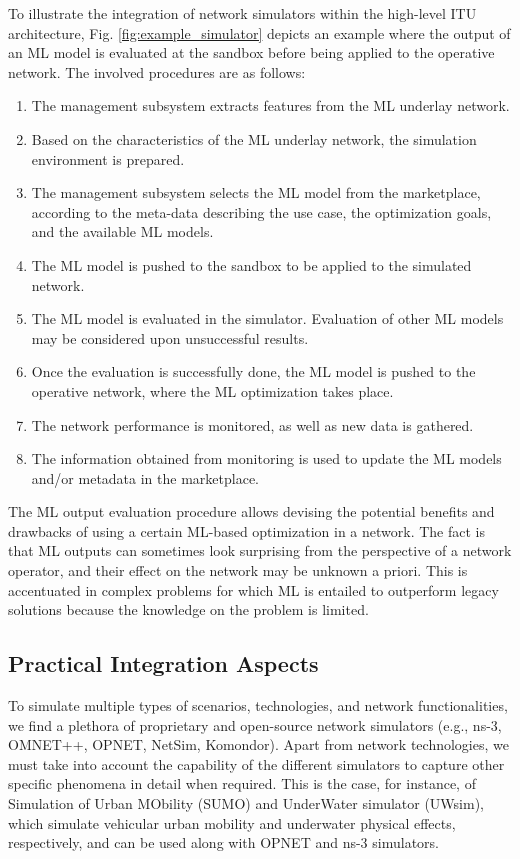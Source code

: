 \documentclass[journal]{IEEEtran}
\begin{document}
	To illustrate the integration of network simulators within the high-level ITU architecture, Fig. \ref{fig:example_simulator} depicts an example where the output of an ML model is evaluated at the sandbox before being applied to the operative network. The involved procedures are as follows:
	\begin{enumerate}
		\item The management subsystem extracts features from the ML underlay network.
		\item Based on the characteristics of the ML underlay network, the simulation environment is prepared.
		\item The management subsystem selects the ML model from the marketplace, according to the meta-data describing the use case, the optimization goals, and the available ML models.
		\item The ML model is pushed to the sandbox to be applied to the simulated network.
		\item The ML model is evaluated in the simulator. Evaluation of other ML models may be considered upon unsuccessful results.
		\item Once the evaluation is successfully done, the ML model is pushed to the operative network, where the ML optimization takes place. 
		\item The network performance is monitored, as well as new data is gathered.
		\item The information obtained from monitoring is used to update the ML models and/or metadata in the marketplace.  
	\end{enumerate}

    The ML output evaluation procedure allows devising the potential benefits and drawbacks of using a certain ML-based optimization in a network. The fact is that ML outputs can sometimes look surprising from the perspective of a network operator, and their effect on the network may be unknown a priori. This is accentuated in complex problems for which ML is entailed to outperform legacy solutions because the knowledge on the problem is limited.

	\subsection{Practical Integration Aspects}
	
	To simulate multiple types of scenarios, technologies, and network functionalities, we find a plethora of proprietary and open-source network simulators (e.g., ns-3, OMNET++, OPNET, NetSim, Komondor). Apart from network technologies, we must take into account the capability of the different simulators to capture other specific phenomena in detail when required. This is the case, for instance, of Simulation of Urban MObility (SUMO) and UnderWater simulator (UWsim), which simulate vehicular urban mobility and underwater physical effects, respectively, and can be used along with OPNET and ns-3 simulators.
	     
\end{document}
